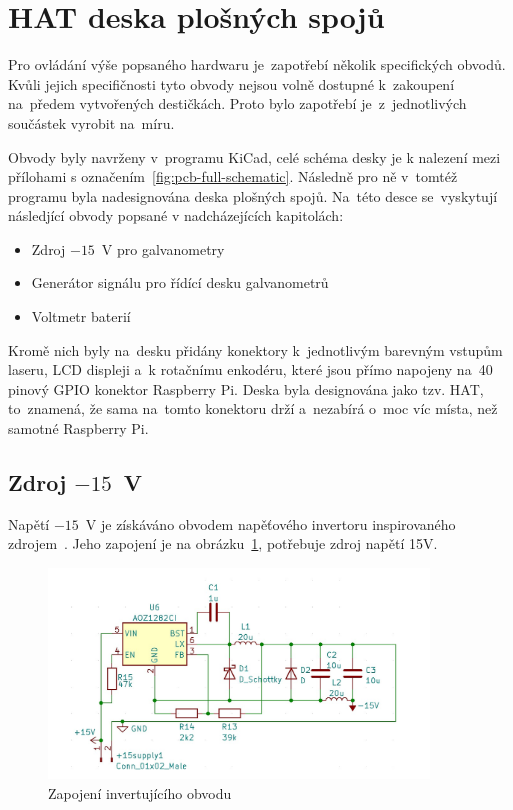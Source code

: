 \section{HAT deska plošných spojů}
Pro ovládání výše popsaného hardwaru je~zapotřebí několik specifických obvodů.
Kvůli jejich specifičnosti tyto obvody nejsou volně dostupné k~zakoupení na~předem vytvořených destičkách. Proto bylo zapotřebí je~z~jednotlivých součástek vyrobit na~míru.

Obvody byly navrženy v~programu KiCad, celé schéma desky je k nalezení mezi přílohami s označením~\ref{fig:pcb-full-schematic}. Následně pro ně v~tomtéž programu byla nadesignována deska plošných spojů. Na~této desce se~vyskytují následjící obvody popsané v nadcházejících kapitolách:
\begin{itemize}
  \item Zdroj $-15$~V pro galvanometry
  \item Generátor signálu pro řídící desku galvanometrů
  \item Voltmetr baterií
\end{itemize}

Kromě nich byly na~desku přidány konektory k~jednotlivým barevným vstupům laseru, LCD displeji a~k rotačnímu enkodéru, které jsou přímo napojeny na~40 pinový GPIO konektor Raspberry Pi.
Deska byla designována jako tzv. HAT, to~znamená, že sama na~tomto konektoru drží a~nezabírá o~moc víc místa, než samotné Raspberry Pi.

\subsection{Zdroj $-15$~V~\cite{ampalyzer}}\label{sec:negative-ps}
Napětí $-15$~V je získáváno obvodem napěťového invertoru inspirovaného zdrojem~\cite{ampalyzer}. Jeho zapojení je na obrázku~\ref{fig:negative-ps}, potřebuje zdroj napětí 15V.

\begin{figure}[htb]
  \centering
  \includegraphics[width=0.9\textwidth]{img/negative-ps.jpg}
  \caption{\label{fig:negative-ps} Zapojení invertujícího obvodu}
\end{figure}

